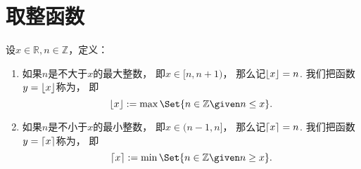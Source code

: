 \section{取整函数}
\begin{definition}[取整函数]
设\(x\in\mathbb{R},
n\in\mathbb{Z}\)，定义：
\begin{enumerate}
	\item 如果\(n\)是不大于\(x\)的最大整数，
	即\(x\in[n,n+1)\)，
	那么记\(\lfloor x\rfloor=n\).
	我们把函数\(y=\lfloor x\rfloor\)称为，
	即\begin{equation}
		\floor{x}
		\defeq
		\max\Set{ n\in\mathbb{Z} \given n \leq x }.
	\end{equation}

	\item 如果\(n\)是不小于\(x\)的最小整数，
	即\(x\in(n-1,n]\)，
	那么记\(\lceil x\rceil=n\).
	我们把函数\(y=\lceil x\rceil\)称为，
	即\begin{equation}
		\ceil{x}
		\defeq
		\min\Set{ n\in\mathbb{Z} \given n \geq x }.
	\end{equation}
\end{enumerate}
\end{definition}

